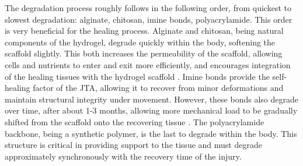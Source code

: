 The degradation process roughly follows in the following order, from quickest to slowest degradation: alginate, chitosan, imine bonds, polyacrylamide. This order is very beneficial for the healing process. Alginate and chitosan, being natural components of the hydrogel, degrade quickly within the body, softening the scaffold slightly.
This both increases the permeability of the scaffold, allowing cells and nutrients to enter and exit more efficiently, and encourages integration of the healing tissues with the hydrogel scaffold \autocite{RN4}.
Imine bonds provide the self-healing factor of the JTA, allowing it to recover from minor deformations and maintain structural integrity under movement. However, these bonds also degrade over time, after about 1-3 months, allowing more mechanical load to be gradually shifted from the scaffold onto the recovering tissue \autocite{xuHydrogelsBasedSchiff2019}.
The polyacrylamide backbone, being a synthetic polymer, is the last to degrade within the body. This structure is critical in providing support to the tissue and must degrade approximately synchronously with the recovery time of the injury.